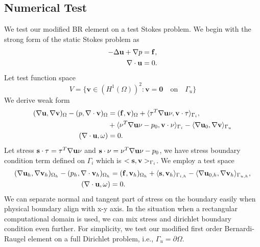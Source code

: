 \subsection{Numerical Test}
\iffalse
We test our modified BR element on a test Stokes problem. 
We begin with the strong form of the static Stokes problem as 
\begin{equation}\label{eq:strongStokes}
\begin{aligned}
-\Delta \mathbf{u} + \nabla p &= \mathbf{f}, \\
\nabla \cdot \bold{u} &= 0.
\end{aligned}
\end{equation}
Let test function space
\begin{equation}\label{eq:testspace}
		  V = \{ \mathbf{v} \in (H^1(\Omega))^2 : \mathbf{v} = \mathbf{0} \quad \text{on} \quad \Gamma_u \}
\end{equation}
We derive weak form 
\begin{equation}\label{eq:weakStokes}
\begin{aligned}
(\nabla \bold{u} , \nabla \bold{v})_{\Omega} - (p,\nabla \cdot \bold{v})_{\Omega} &= (\bold{f},\bold{v})_{\Omega} + 
\langle\tau^T \nabla \bold{u} \nu, \bold{v}\cdot \tau\rangle_{\Gamma_i},\\
&+ \langle\nu^T \nabla \bold{u} \nu - p_0, \bold{v}\cdot \nu\rangle_{\Gamma_i} - \langle\nabla \bold{u}_0, \nabla \bold{v}\rangle_{\Gamma_u}\\
(\nabla \cdot \bold{u}, \omega) &= 0.
\end{aligned}
\end{equation}
Let stress $\bold{s}\cdot \tau = \tau^T \nabla \bold{u} \nu $ and  $\bold{s} \cdot \nu =  \nu^T \nabla \bold{u} \nu - p_0$, 
we have stress boundary condition term defined on $\Gamma_i$ which is $<\bold{s},\bold{v}>_{\Gamma_i}$.
We employ a test space 
\begin{equation}\label{eq:weakStokes2}
\begin{aligned}
(\nabla \bold{u}_h , \nabla \bold{v}_h)_{\Omega_h} - (p_h,\nabla \cdot \bold{v}_h)_{\Omega_h} &= (\bold{f},\bold{v}_h)_{\Omega_h} + 
		  \langle\bold{s}, \bold{v}_h\rangle_{\Gamma_{i,h}} - \langle\nabla \bold{u}_{0,h}, \nabla \bold{v}_h\rangle_{\Gamma_{u,h}},\\
(\nabla \cdot \bold{u}, \omega) &= 0.
\end{aligned}
\end{equation}
We can separate normal and tangent part of stress on the boundary easily when physical boundary align with x-y axis.
In the situation when a rectangular computational domain is used, we can mix stress and dirichlet boundary condition
even further. For simplicity, we test our modified first order Bernardi-Raugel element on a full Dirichlet problem, 
i.e., $\Gamma_u = \partial \Omega$.

